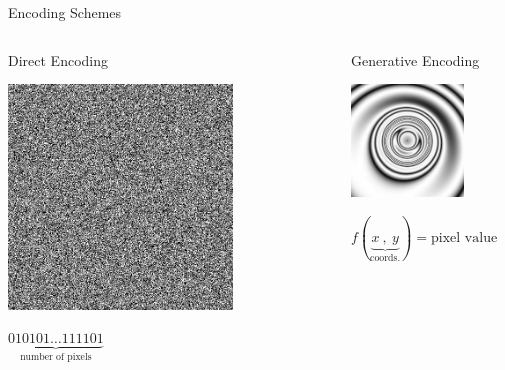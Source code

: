 \documentclass[6pt]{beamer}
\begin{document}
{\begin{frame}{Encoding Schemes}
\begin{columns}[T] %
\begin{column}{.49\textwidth}
\begin{block}{Direct Encoding}
\begin{center}
\includegraphics[width=0.7\textwidth]{../Figures/Misc/direct.jpg}
\end{center}
\end{block}
\centering
$\underbrace{010101\ldots111101}_\text{number of pixels}$
\end{column}%
\hfill%
\begin{column}{.49\textwidth}
\begin{block}{Generative Encoding}
\begin{center}
\includegraphics[width=0.7\textwidth]{../Figures/Misc/picBreed1.jpg}
\end{center}
\end{block}
\centering
$f(\underbrace{x\   ,\  y}_\text{coords.}) = \text{pixel value}$
\end{column}%
\end{columns}
\end{frame}
}
\end{document}
